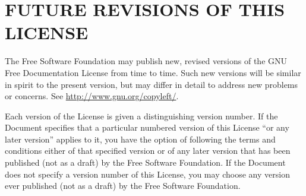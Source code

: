 \section{FUTURE REVISIONS OF THIS LICENSE}
The Free Software Foundation may publish new, revised versions of the GNU Free Documentation
License from time to time. Such new versions will be similar in spirit to the present version,
but may differ in detail to address new problems or concerns.
See \href{http://www.gnu.org/copyleft/}{http://www.gnu.org/copyleft/}.

Each version of the License is given a distinguishing version number. If the Document
specifies that a particular numbered version of this License ``or any later version'' applies to it,
you have the option of following the terms and conditions either of that specified version or of
any later version that has been published (not as a draft) by the Free Software Foundation. If
the Document does not specify a version number of this License, you may choose any version
ever published (not as a draft) by the Free Software Foundation.




